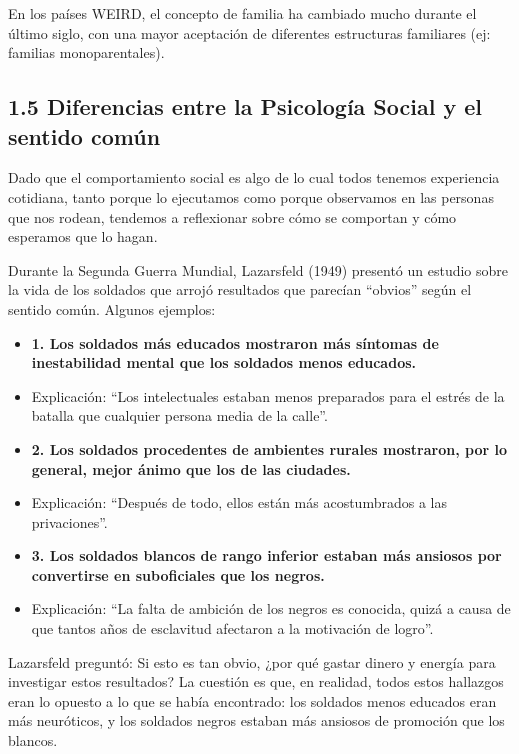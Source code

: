 \documentclass[
]{website}
\begin{document}
En los países WEIRD, el concepto de familia ha cambiado mucho durante el último siglo, con una mayor aceptación de diferentes estructuras familiares (ej: familias monoparentales).

\subsection*{1.5 Diferencias entre la Psicología Social y el sentido común}\label{subtema1_5}

Dado que el comportamiento social es algo de lo cual todos tenemos experiencia cotidiana, tanto porque lo ejecutamos como porque observamos en las personas que nos rodean, tendemos a reflexionar sobre cómo se comportan y cómo esperamos que lo hagan.

Durante la Segunda Guerra Mundial, Lazarsfeld (1949) presentó un estudio sobre la vida de los soldados que arrojó resultados que parecían ``obvios'' según el sentido común. Algunos ejemplos:

\begin{itemize}
\item
  \textbf{1. Los soldados más educados mostraron más síntomas de inestabilidad mental que los soldados menos educados.}
\item
  Explicación: ``Los intelectuales estaban menos preparados para el estrés de la batalla que cualquier persona media de la calle''.
\item
  \textbf{2. Los soldados procedentes de ambientes rurales mostraron, por lo general, mejor ánimo que los de las ciudades.}
\item
  Explicación: ``Después de todo, ellos están más acostumbrados a las privaciones''.
\item
  \textbf{3. Los soldados blancos de rango inferior estaban más ansiosos por convertirse en suboficiales que los negros.}
\item
  Explicación: ``La falta de ambición de los negros es conocida, quizá a causa de que tantos años de esclavitud afectaron a la motivación de logro''.
\end{itemize}

Lazarsfeld preguntó: Si esto es tan obvio, ¿por qué gastar dinero y energía para investigar estos resultados? La cuestión es que, en realidad, todos estos hallazgos eran lo opuesto a lo que se había encontrado: los soldados menos educados eran más neuróticos, y los soldados negros estaban más ansiosos de promoción que los blancos.
\end{document}
